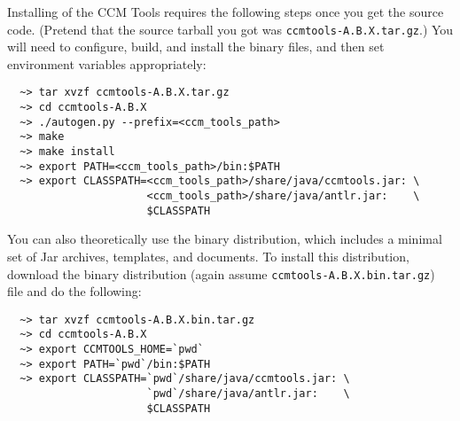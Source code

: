 Installing of the CCM Tools requires the following steps once you get the source
code. (Pretend that the source tarball you got was {\tt ccmtools-A.B.X.tar.gz}.)
You will need to configure, build, and install the binary files, and then set
environment variables appropriately:
\begin{small}
\begin{verbatim}
  ~> tar xvzf ccmtools-A.B.X.tar.gz
  ~> cd ccmtools-A.B.X
  ~> ./autogen.py --prefix=<ccm_tools_path>
  ~> make
  ~> make install
  ~> export PATH=<ccm_tools_path>/bin:$PATH
  ~> export CLASSPATH=<ccm_tools_path>/share/java/ccmtools.jar: \
                      <ccm_tools_path>/share/java/antlr.jar:    \
                      $CLASSPATH
\end{verbatim}
\end{small}

You can also theoretically use the binary distribution, which includes a minimal
set of Jar archives, templates, and documents. To install this distribution,
download the binary distribution (again assume {\tt ccmtools-A.B.X.bin.tar.gz})
file and do the following:
\begin{small}
\begin{verbatim}
  ~> tar xvzf ccmtools-A.B.X.bin.tar.gz
  ~> cd ccmtools-A.B.X
  ~> export CCMTOOLS_HOME=`pwd`
  ~> export PATH=`pwd`/bin:$PATH
  ~> export CLASSPATH=`pwd`/share/java/ccmtools.jar: \
                      `pwd`/share/java/antlr.jar:    \
                      $CLASSPATH
\end{verbatim}
\end{small}

